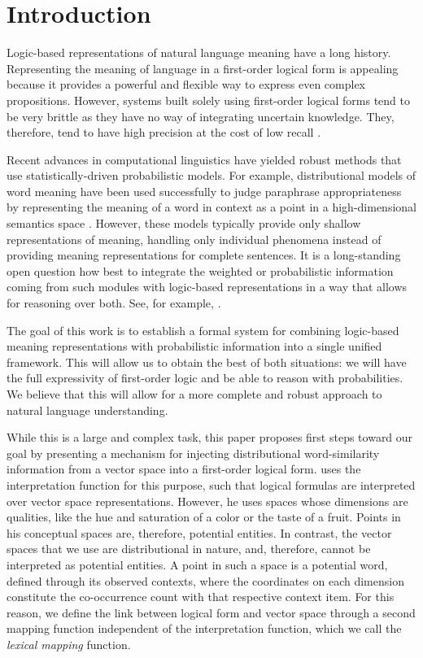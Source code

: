 \section{Introduction}

Logic-based representations of natural language meaning have a long history.
Representing the meaning of language in a first-order logical form is appealing
because it provides a powerful and flexible way to express even complex
propositions. However, systems built solely using first-order logical forms tend
to be very brittle as they have no way of integrating uncertain knowledge.
They, therefore, tend to have high precision at the cost of low recall
\citep{bos:emnlp2005}.

Recent advances in computational linguistics have yielded robust methods that
use statistically-driven probabilistic models.  For example, distributional
models of word meaning have been used successfully to judge paraphrase
appropriateness by representing the meaning of a word in context as a point in a
high-dimensional semantics space
\citep{erk:emnlp2008,thater:acl2010,erk:acl2010}.
However, these models typically provide only shallow representations of meaning,
handling only individual phenomena instead of providing meaning representations
for complete sentences. It is a long-standing open question how best to
integrate the weighted or probabilistic information coming from such modules
with logic-based representations in a way that allows for reasoning over both. 
See, for example, \citet{hobbs:alj93}.

The goal of this work is to establish a formal system for combining
logic-based meaning representations with probabilistic information into a single
unified framework.  This will allow us to obtain the best of both situations: we
will have the full expressivity of first-order logic and be able to reason with
probabilities.  We believe that this will allow for a more complete and robust
approach to natural language understanding.

While this is a large and complex task, this paper proposes first steps toward
our goal by presenting a mechanism for injecting distributional word-similarity
information from a vector space into a first-order logical form.  
\citet{gardenfors:book2004} uses the interpretation function for this purpose,
such that logical formulas are interpreted over vector space representations.
However, he uses spaces whose dimensions are qualities, like the hue and
saturation of a color or the taste of a fruit. Points in his conceptual spaces
are, therefore, potential entities.  In contrast, the vector spaces that we use
are distributional in nature, and, therefore, cannot be interpreted as potential
entities. A point in such a space is a potential word, defined through
its observed contexts, where the coordinates on each dimension constitute the
co-occurrence count with that respective context item.  For this reason, we
define the link between logical form and vector space through a second mapping
function independent of the interpretation function, which we call the
\emph{lexical mapping} function.


